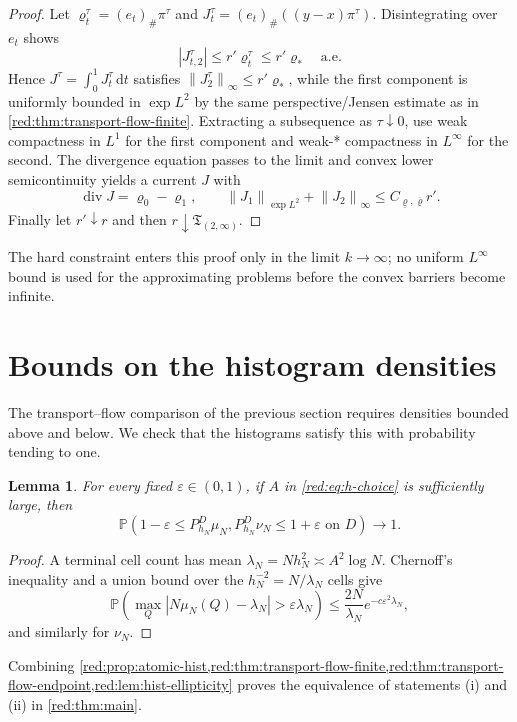 \documentclass[11pt]{article}
\newtheorem{lemma}[lemma]{Lemma}
\theoremstyle{definition}
\theoremstyle{remark}
\numberwithin{equation}{section}
\newcommand{\Pp}{\mathbb P}
\newcommand{\divv}{\operatorname{div}}
\newcommand{\norm}[1]{\left\|#1\right\|}
\newcommand{\dd}{\,\mathrm d}
\newcommand{\pa}[1]{\left(#1\right)}
\begin{document}
\begin{proof}
Let $\varrho_t^\tau=(e_t)_\#\pi^\tau$ and
$J_t^\tau=(e_t)_\#((y-x)\pi^\tau)$.  Disintegrating over $e_t$ shows
\[
 |J_{t,2}^\tau|\le r'\varrho_t^\tau\le r'\varrho_*
 \quad\text{a.e.}
\]
Hence $J^\tau=\int_0^1J_t^\tau\dd t$ satisfies
$\norm{J_2^\tau}_\infty\le r'\varrho_*$, while the first component is
uniformly bounded in $\exp L^2$ by the same perspective/Jensen estimate as in
\cref{red:thm:transport-flow-finite}.  Extracting a subsequence as
$\tau\downarrow0$, use weak compactness in $L^1$ for the first component
and weak-* compactness in $L^\infty$ for the second.  The divergence equation
passes to the limit and convex lower semicontinuity yields a current $J$ with
\[
 \divv J=\varrho_0-\varrho_1,
 \qquad
 \norm{J_1}_{\exp L^2}+\norm{J_2}_\infty\le C_{\underline\varrho,\overline\varrho}r'.
\]
Finally let $r'\downarrow r$ and then $r\downarrow\mathfrak T_{(2,\infty)}$.
\end{proof}

The hard constraint enters this proof only in the limit $k\to\infty$; no
uniform $L^\infty$ bound is used for the approximating problems before the
convex barriers become infinite.

\section{Bounds on the histogram densities}

The transport--flow comparison of the previous section requires densities
bounded above and below. We check that the histograms satisfy this with
probability tending to one.

\begin{lemma}
\label{red:lem:hist-ellipticity}
For every fixed $\varepsilon\in(0,1)$, if $A$ in \eqref{red:eq:h-choice} is
sufficiently large, then
\[
 \Pp\pa{1-\varepsilon\le P_{h_N}^D\mu_N,
 P_{h_N}^D\nu_N\le1+\varepsilon\text{ on }D}\longrightarrow1.
\]
\end{lemma}

\begin{proof}
A terminal cell count has mean
$\lambda_N=Nh_N^2\asymp A^2\log N$. Chernoff's inequality and a union bound
over the $h_N^{-2}=N/\lambda_N$ cells give
\[
 \Pp\pa{\max_Q|N\mu_N(Q)-\lambda_N|>
 \varepsilon\lambda_N}
 \le\frac{2N}{\lambda_N}e^{-c\varepsilon^2\lambda_N},
\]
and similarly for $\nu_N$.
\end{proof}

Combining \cref{red:prop:atomic-hist,red:thm:transport-flow-finite,red:thm:transport-flow-endpoint,red:lem:hist-ellipticity} proves the equivalence of
statements (i) and (ii) in \cref{red:thm:main}.
\end{document}
